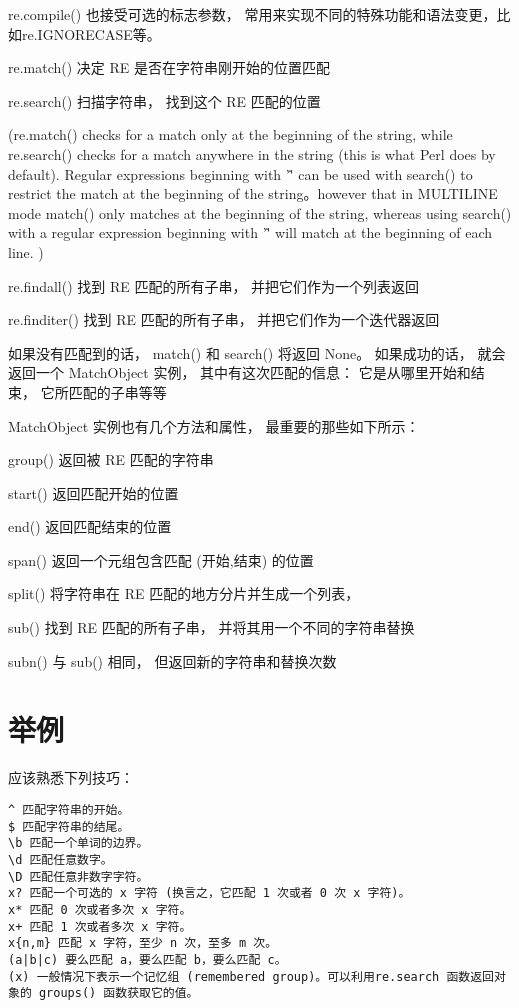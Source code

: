 \documentclass[twoside,11pt]{book}
\begin{document}
re.compile() 也接受可选的标志参数， 常用来实现不同的特殊功能和语法变更，比如re.IGNORECASE等。

re.match() 决定 RE 是否在字符串刚开始的位置匹配

re.search() 扫描字符串， 找到这个 RE 匹配的位置

(re.match() checks for a match only at the beginning of the string, while re.search() checks for a match anywhere in the string (this is what Perl does by default). Regular expressions beginning with '\^' can be used with search() to restrict the match at the beginning of the string。however that in MULTILINE mode match() only matches at the beginning of the string, whereas using search() with a regular expression beginning with '\^' will match at the beginning of each line.
)


re.findall() 找到 RE 匹配的所有子串， 并把它们作为一个列表返回

re.finditer() 找到 RE 匹配的所有子串， 并把它们作为一个迭代器返回

如果没有匹配到的话， match() 和 search() 将返回 None。 如果成功的话， 就会返回一个
MatchObject 实例， 其中有这次匹配的信息： 它是从哪里开始和结束， 它所匹配的子串等等

MatchObject 实例也有几个方法和属性， 最重要的那些如下所示：

group() 返回被 RE 匹配的字符串

start() 返回匹配开始的位置

end() 返回匹配结束的位置

span() 返回一个元组包含匹配 (开始,结束) 的位置

split() 将字符串在 RE 匹配的地方分片并生成一个列表，

sub() 找到 RE 匹配的所有子串， 并将其用一个不同的字符串替换

subn() 与 sub() 相同， 但返回新的字符串和替换次数




\section{举例}
应该熟悉下列技巧：
\begin{lstlisting}
^ 匹配字符串的开始。
$ 匹配字符串的结尾。
\b 匹配一个单词的边界。
\d 匹配任意数字。
\D 匹配任意非数字字符。
x? 匹配一个可选的 x 字符 (换言之，它匹配 1 次或者 0 次 x 字符)。
x* 匹配 0 次或者多次 x 字符。
x+ 匹配 1 次或者多次 x 字符。
x{n,m} 匹配 x 字符，至少 n 次，至多 m 次。
(a|b|c) 要么匹配 a，要么匹配 b，要么匹配 c。
(x) 一般情况下表示一个记忆组 (remembered group)。可以利用re.search 函数返回对象的 groups() 函数获取它的值。
\end{lstlisting}
\end{document}

